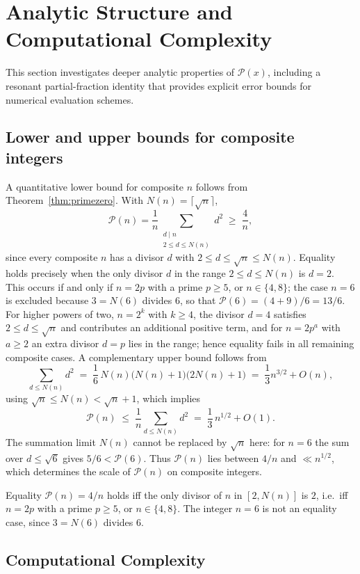 \section{Analytic Structure and Computational Complexity}

This section investigates deeper analytic properties of $\mathcal{P}(x)$, including a resonant partial-fraction identity that provides explicit error bounds for numerical evaluation schemes.

\subsection{Lower and upper bounds for composite integers}
A quantitative lower bound for composite $n$ follows from Theorem~\ref{thm:primezero}. With $N(n)=\lceil\sqrt n\rceil$,
\[
\mathcal{P}(n) = \frac{1}{n} \sum_{\substack{d\mid n \\ 2 \le d \le N(n)}} d^2 \;\ge\; \frac{4}{n},
\]
since every composite $n$ has a divisor $d$ with $2\le d\le\sqrt n\le N(n)$.
Equality holds precisely when the only divisor $d$ in the range $2\le d\le N(n)$ is $d=2$. This occurs if and only if $n=2p$ with a prime $p\ge5$, or $n\in\{4,8\}$; the case $n=6$ is excluded because $3=N(6)$ divides $6$, so that $\mathcal P(6)=(4+9)/6=13/6$. For higher powers of two, $n=2^k$ with $k\ge 4$, the divisor $d=4$ satisfies $2\le d\le\sqrt{n}$ and contributes an additional positive term, and for $n=2p^a$ with $a\ge 2$ an extra divisor $d=p$ lies in the range; hence equality fails in all remaining composite cases. A complementary upper bound follows from
\[
\sum_{d\le N(n)} d^2 \;=\; \frac{1}{6}\,N(n)\bigl(N(n)+1\bigr)\bigl(2N(n)+1\bigr)
\;=\; \frac{1}{3}n^{3/2} + O(n),
\]
using $\sqrt n\le N(n)<\sqrt n+1$, which implies
\[
\mathcal{P}(n) \;\le\; \frac{1}{n}\sum_{d\le N(n)} d^2
\;=\; \frac{1}{3}\,n^{1/2} + O(1).
\]
The summation limit $N(n)$ cannot be replaced by $\sqrt n$ here: for $n=6$ the sum over $d\le\sqrt6$ gives $5/6<\mathcal P(6)$.
Thus $\mathcal{P}(n)$ lies between $4/n$ and $\ll n^{1/2}$, which determines the scale of $\mathcal{P}(n)$ on composite integers.

\begin{remark}
Equality $\mathcal{P}(n)=4/n$ holds iff the only divisor of $n$ in $[2,N(n)]$ is $2$, i.e.\ iff $n=2p$ with a prime $p\ge5$, or $n\in\{4,8\}$. The integer $n=6$ is not an equality case, since $3=N(6)$ divides $6$.
\end{remark}

\subsection{Computational Complexity}

